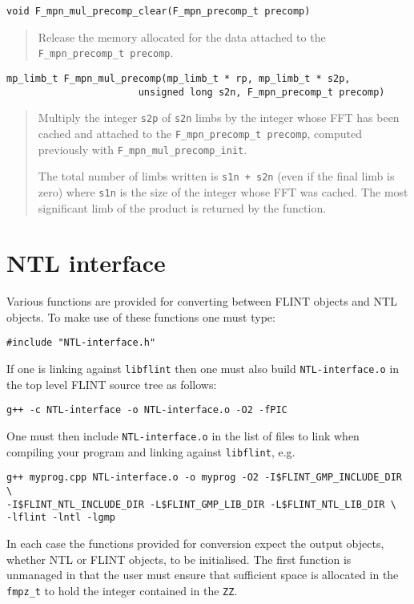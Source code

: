 \documentclass[a4paper,10pt]{article}
\newcommand{\code}{\lstinline}
\begin{document}
\begin{lstlisting}
void F_mpn_mul_precomp_clear(F_mpn_precomp_t precomp)
\end{lstlisting}
\begin{quote}
Release the memory allocated for the data attached to the \code{F_mpn_precomp_t precomp}.
\end{quote}

\begin{lstlisting}
mp_limb_t F_mpn_mul_precomp(mp_limb_t * rp, mp_limb_t * s2p, 
                       unsigned long s2n, F_mpn_precomp_t precomp)
\end{lstlisting}
\begin{quote}
Multiply the integer \code{s2p} of \code{s2n} limbs by the integer whose FFT has been cached and attached to the \code{F_mpn_precomp_t precomp}, computed previously with \code{F_mpn_mul_precomp_init}. 

The total number of limbs written is \code{s1n + s2n} (even if the final limb is zero) where \code{s1n} is the size of the integer whose FFT was cached. The most significant limb of the product is returned by the function.
\end{quote}
                      
\section{NTL interface}
Various functions are provided for converting between FLINT objects and NTL objects. To make use of these functions one must type:

\code{#include "NTL-interface.h"}

If one is linking against \code{libflint} then one must also build \code{NTL-interface.o} in the top level FLINT source tree as follows:
\begin{lstlisting}
g++ -c NTL-interface -o NTL-interface.o -O2 -fPIC
\end{lstlisting}

One must then include \code{NTL-interface.o} in the list of files to link when compiling your program and linking against \code{libflint}, e.g.

\begin{lstlisting}
g++ myprog.cpp NTL-interface.o -o myprog -O2 -I$FLINT_GMP_INCLUDE_DIR \
-I$FLINT_NTL_INCLUDE_DIR -L$FLINT_GMP_LIB_DIR -L$FLINT_NTL_LIB_DIR \
-lflint -lntl -lgmp
\end{lstlisting}

In each case the functions provided for conversion expect the output objects, whether NTL or FLINT objects, to be initialised. The first function is unmanaged in that the 
user must ensure that sufficient space is allocated in the \code{fmpz_t} to hold the integer contained in the \code{ZZ}.
\end{document}

